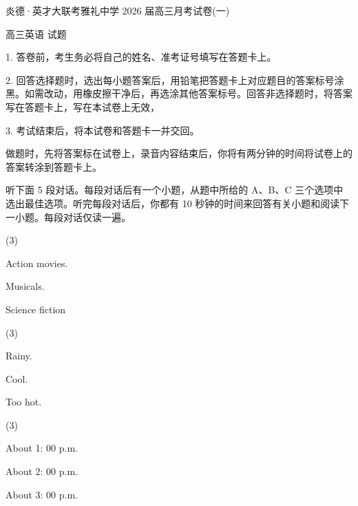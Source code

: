 \documentclass{英语试卷}
\begin{document}
\par 炎德·英才大联考雅礼中学 2026 届高三月考试卷(一)\par
\par 高三英语 试题\par
\begin{notice}
\par 1. 答卷前，考生务必将自己的姓名、准考证号填写在答题卡上。\par
\par 2. 回答选择题时，选出每小题答案后，用铅笔把答题卡上对应题目的答案标号涂黑。如需改动，用橡皮擦干净后，再选涂其他答案标号。回答非选择题时，将答案写在答题卡上，写在本试卷上无效，\par
\par 3. 考试结束后，将本试卷和答题卡一并交回。\par
\end{notice}
\par 做题时，先将答案标在试卷上，录音内容结束后，你将有两分钟的时间将试卷上的答案转涂到答题卡上。\par
{}
\par 听下面 5 段对话。每段对话后有一个小题，从题中所给的 A、B、C 三个选项中选出最佳选项。听完每段对话后，你都有 10 秒钟的时间来回答有关小题和阅读下一小题。每段对话仅读一遍。\par
{}
\begin{choices}(3)
  \item Action movies.
  \item Musicals.
  \item Science fiction
\end{choices}
\begin{choices}(3)
  \item Rainy.
  \item Cool.
  \item Too hot.
\end{choices}
\begin{choices}(3)
  \item About 1: 00 p.m.
  \item About 2: 00 p.m.
  \item About 3: 00 p.m.
\end{choices}
\end{document}
